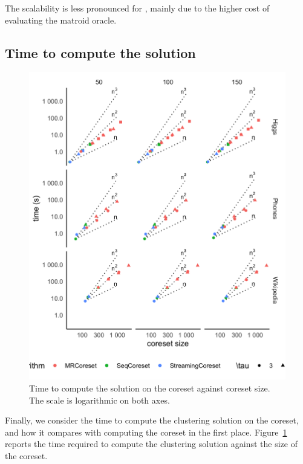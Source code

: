 The scalability is less pronounced for \wiki, mainly due to the higher cost of evaluating the matroid oracle.

\subsection{Time to compute the solution}

\begin{figure}
    \includegraphics[width=\columnwidth]{solution-time.png}
    \caption{
        \label{fig:solution-time}
        Time to compute the solution on the coreset against coreset size.
        The scale is logarithmic on both axes.
    }
\end{figure}

Finally, we consider the time to compute the clustering solution on the coreset, and 
how it compares with computing the coreset in the first place.
Figure~\ref{fig:solution-time} reports the time required to compute the clustering
solution against the size of the coreset.

